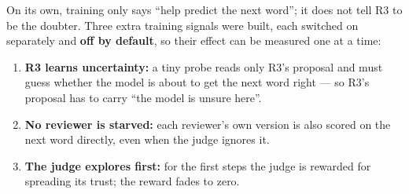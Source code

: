 \documentclass[a4paper,12pt,parskip=half,headsepline]{scrartcl}
\begin{document}
\begin{plain}
On its own, training only says ``help predict the next word''; it does not tell R3
to be the doubter. Three extra training signals were built, each switched on
separately and \textbf{off by default}, so their effect can be measured one at a time:
\begin{enumerate}
\item \textbf{R3 learns uncertainty:} a tiny probe reads only R3's proposal and must
guess whether the model is about to get the next word right --- so R3's proposal has
to carry ``the model is unsure here''.
\item \textbf{No reviewer is starved:} each reviewer's own version is also scored on
the next word directly, even when the judge ignores it.
\item \textbf{The judge explores first:} for the first steps the judge is rewarded for
spreading its trust; the reward fades to zero.
\end{enumerate}
\end{plain}
\end{document}
